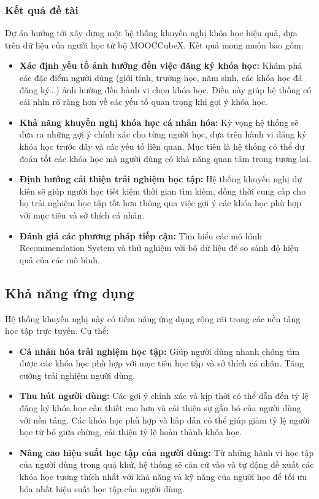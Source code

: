\subsubsection{Kết quả đề tài}
Dự án hướng tới xây dựng một hệ thống khuyến nghị khóa học hiệu quả, dựa trên dữ liệu của người học từ bộ MOOCCubeX. Kết quả mong muốn bao gồm:
\begin{itemize}
    \item \textbf{Xác định yếu tố ảnh hưởng đến việc đăng ký khóa học:} Khám phá các đặc điểm người dùng (giới tính, trường học, năm sinh, các khóa học đã đăng ký...) ảnh hưởng đến hành vi chọn khóa học. Điều này giúp hệ thống có cái nhìn rõ ràng hơn về các yếu tố quan trọng khi gợi ý khóa học.
    \item \textbf{Khả năng khuyến nghị khóa học cá nhân hóa:} Kỳ vọng hệ thống sẽ đưa ra những gợi ý chính xác cho từng người học, dựa trên hành vi đăng ký khóa học trước đây và các yếu tố liên quan. Mục tiêu là hệ thống có thể dự đoán tốt các khóa học mà người dùng có khả năng quan tâm trong tương lai.
    \item \textbf{Định hướng cải thiện trải nghiệm học tập:} Hệ thống khuyến nghị dự kiến sẽ giúp người học tiết kiệm thời gian tìm kiếm, đồng thời cung cấp cho họ trải nghiệm học tập tốt hơn thông qua việc gợi ý các khóa học phù hợp với mục tiêu và sở thích cá nhân.
    \item \textbf{Đánh giá các phương pháp tiếp cận:} Tìm hiểu các mô hình Recommendation System và thử nghiệm với bộ dữ liệu để so sánh độ hiệu quả của các mô hình.
\end{itemize}
\subsection{Khả năng ứng dụng}
Hệ thống khuyến nghị này có tiềm năng ứng dụng rộng rãi trong các nền tảng học tập trực tuyến. Cụ thể:
\begin{itemize}
    \item \textbf{Cá nhân hóa trải nghiệm học tập:} Giúp người dùng nhanh chóng tìm được các khóa học phù hợp với mục tiêu học tập và sở thích cá nhân. Tăng cường trải nghiệm người dùng.
    \item \textbf{Thu hút người dùng:} Các gợi ý chính xác và kịp thời có thể dẫn đến tỷ lệ đăng ký khóa học cần thiết cao hơn và cải thiện sự gắn bó của người dùng với nền tảng. Các khóa học phù hợp và hấp dẫn có thể giúp giảm tỷ lệ người học từ bỏ giữa chừng, cải thiện tỷ lệ hoàn thành khóa học.
    \item \textbf{Nâng cao hiệu suất học tập của người dùng:} Từ những hành vi học tập của người dùng trong quá khứ, hệ thống sẽ căn cứ vào và tự động đề xuất các khóa học tương thích nhất với khả năng và kỹ năng của người học để tối ưu hóa nhất hiệu suất học tập của người dùng.
\end{itemize}
